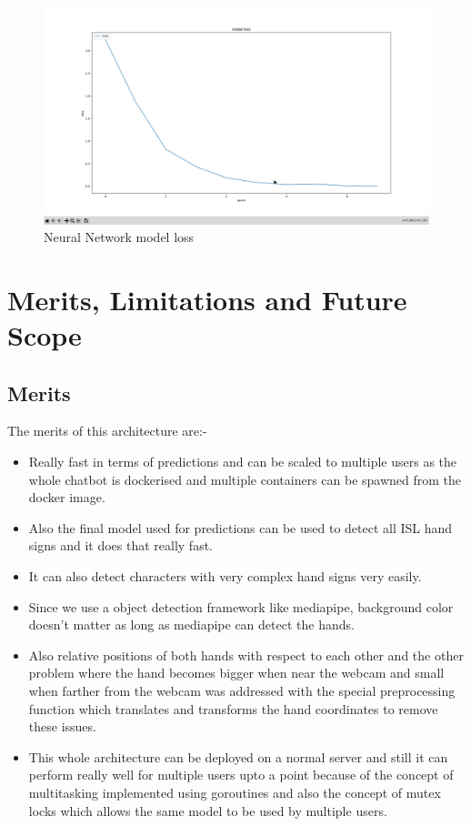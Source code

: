 \documentclass[12pt,a4paper]{report}
\begin{document}
\begin{figure}[htbp]
	\centerline{\includegraphics[scale=0.15]{neural_network_loss.png}}
	\caption{Neural Network model loss}
	\label{Neural_net_loss}
\end{figure}

\chapter{Merits, Limitations and Future Scope}

\section{Merits}
The merits of this architecture are:-
\begin{itemize}
	\item Really fast in terms of predictions and can be scaled to multiple users as the whole chatbot is dockerised and multiple containers can be spawned from the docker image.
	\item Also the final model used for predictions can be used to detect all ISL hand signs and it does that really fast.
	\item It can also detect characters with very complex hand signs very easily.
	\item Since we use a object detection framework like mediapipe, background color doesn't matter as long as mediapipe can detect the hands.
	\item Also relative positions of both hands with respect to each other and the other problem where the hand becomes bigger when near the webcam and small when farther from the webcam was addressed with the special preprocessing function which translates and transforms the hand coordinates to remove these issues.
	\item This whole architecture can be deployed on a normal server and still it can perform really well for multiple users upto a point because of the concept of multitasking implemented using goroutines and also the concept of mutex locks which allows the same model to be used by multiple users.
\end{itemize}
\end{document}
